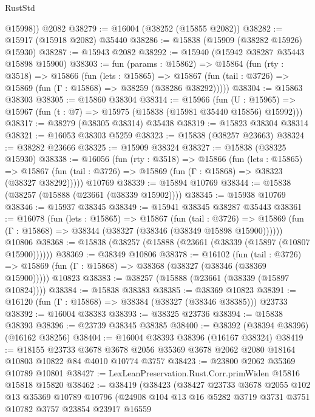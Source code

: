 \begin{lexlean}{RustStd}
\begin{coremodule}
        @15998))
    @2082
@38279 := @16004 (@38252 (@15855 @2082))
@38282 := @15917 (@15918 @2082) @35440
@38286 := @15838 (@15909 (@38282 @15926) @15930)
@38287 := @15943 @2082
@38292 := @15940 (@15942 @38287 @35443 @15898 @15900)
@38303 := fun (params : @15862) =>
  @15864
    (fun (rty : @3518) =>
    @15866
      (fun (lets : @15865) =>
      @15867 (fun (tail : @3726) => @15869 (fun (Γ : @15868) => @38259 (@38286 @38292)))))
@38304 := @15863 @38303
@38305 := @15860 @38304
@38314 := @15966
    (fun (U : @15965) => @15967 (fun (t : @7) => @15975 (@15838 (@15981 @35440 @15856) @15992)))
@38317 := @38279 (@38305 @38314) @35438
@38319 := @15823 @38304 @38314
@38321 := @16053 @38303 @5259
@38323 := @15838 (@38257 @23663)
@38324 := @38282 @23666
@38325 := @15909 @38324
@38327 := @15838 (@38325 @15930)
@38338 := @16056
    (fun (rty : @3518) =>
    @15866
      (fun (lets : @15865) =>
      @15867 (fun (tail : @3726) => @15869 (fun (Γ : @15868) => @38323 (@38327 @38292)))))
    @10769
@38339 := @15894 @10769
@38344 := @15838 (@38257 (@15888 (@23661 (@38339 @15902))))
@38345 := @15938 @10769
@38346 := @15937 @38345
@38349 := @15941 @38345 @38287 @35443
@38361 := @16078
    (fun (lets : @15865) =>
    @15867
      (fun (tail : @3726) =>
      @15869 (fun (Γ : @15868) => @38344 (@38327 (@38346 (@38349 @15898 @15900))))))
    @10806
@38368 := @15838 (@38257 (@15888 (@23661 (@38339 (@15897 (@10807 @15900))))))
@38369 := @38349 @10806
@38378 := @16102
    (fun (tail : @3726) => @15869 (fun (Γ : @15868) => @38368 (@38327 (@38346 (@38369 @15900)))))
    @10823
@38383 := @38257 (@15888 (@23661 (@38339 (@15897 @10824))))
@38384 := @15838 @38383
@38385 := @38369 @10823
@38391 := @16120 (fun (Γ : @15868) => @38384 (@38327 (@38346 @38385))) @23733
@38392 := @16004 @38383
@38393 := @38325 @23736
@38394 := @15838 @38393
@38396 := @23739 @38345 @38385
@38400 := @38392 (@38394 @38396) (@16162 @38256)
@38404 := @16004 @38393 @38396 (@16167 @38324)
@38419 := @18155
    @23733
    @3678
    @3678
    @2056
    @35369
    @3678
    @2062
    @2080
    @18164
    @10803
    @10822
    @84
    @4010
    @10774
    @3757
@38423 := @23800 @2062 @35369 @10789 @10801
@38427 := LexLeanPreservation.Rust.Corr.primWiden @15816 @15818 @15820
@38462 := @38419
    (@38423
      (@38427
        @23733
        @3678
        @2055
        @102
        @13
        @35369
        @10789
        @10796
        (@24908
          @104
          @13
          @16
          @5282
          @3719
          @3731
          @3751
          @10782
          @3757
          @23854
          @23917
          @16559

\end{coremodule}
\end{lexlean}
